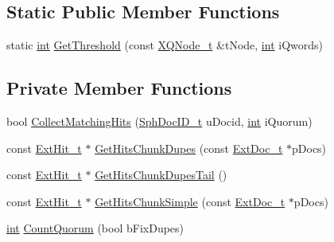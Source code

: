 \subsection*{Static Public Member Functions}
\begin{DoxyCompactItemize}
\item 
static \hyperlink{sphinxexpr_8cpp_a4a26e8f9cb8b736e0c4cbf4d16de985e}{int} \hyperlink{classExtQuorum__c_ab4f34d7c7aa2317ad2de0be05814e41d}{Get\-Threshold} (const \hyperlink{structXQNode__t}{X\-Q\-Node\-\_\-t} \&t\-Node, \hyperlink{sphinxexpr_8cpp_a4a26e8f9cb8b736e0c4cbf4d16de985e}{int} i\-Qwords)
\end{DoxyCompactItemize}
\subsection*{Private Member Functions}
\begin{DoxyCompactItemize}
\item 
bool \hyperlink{classExtQuorum__c_a939ddae310ab77af7978b583116e7c57}{Collect\-Matching\-Hits} (\hyperlink{sphinx_8h_a3176771631c12a9e4897272003e6b447}{Sph\-Doc\-I\-D\-\_\-t} u\-Docid, \hyperlink{sphinxexpr_8cpp_a4a26e8f9cb8b736e0c4cbf4d16de985e}{int} i\-Quorum)
\item 
const \hyperlink{structExtHit__t}{Ext\-Hit\-\_\-t} $\ast$ \hyperlink{classExtQuorum__c_a978b1986a189021d2ef528b94181d68d}{Get\-Hits\-Chunk\-Dupes} (const \hyperlink{structExtDoc__t}{Ext\-Doc\-\_\-t} $\ast$p\-Docs)
\item 
const \hyperlink{structExtHit__t}{Ext\-Hit\-\_\-t} $\ast$ \hyperlink{classExtQuorum__c_aea678a21f0f775655271b7920cdc9483}{Get\-Hits\-Chunk\-Dupes\-Tail} ()
\item 
const \hyperlink{structExtHit__t}{Ext\-Hit\-\_\-t} $\ast$ \hyperlink{classExtQuorum__c_ae3a1514a9ef512162a8ff1cc4c30dca3}{Get\-Hits\-Chunk\-Simple} (const \hyperlink{structExtDoc__t}{Ext\-Doc\-\_\-t} $\ast$p\-Docs)
\item 
\hyperlink{sphinxexpr_8cpp_a4a26e8f9cb8b736e0c4cbf4d16de985e}{int} \hyperlink{classExtQuorum__c_ac04b677a78c4952b11e7a24efb9e4d2f}{Count\-Quorum} (bool b\-Fix\-Dupes)
\end{DoxyCompactItemize}

